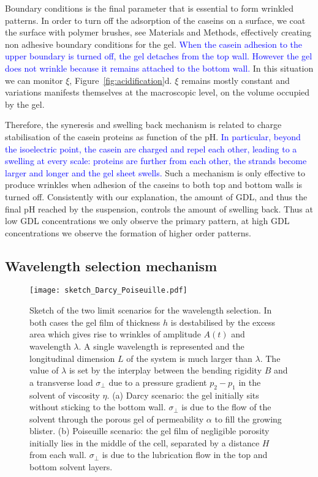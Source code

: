 \documentclass[twocolumn,superscriptaddress,showpacs,preprintnumbers, amsmath,amssymb,prl]{revtex4-1}
\begin{document}
Boundary conditions is the final parameter that is essential to form wrinkled patterns. In order to turn off the adsorption of the caseins on a surface, we coat the surface with polymer brushes, see Materials and Methods, effectively creating non adhesive boundary conditions for the gel. \textcolor{blue}{When the casein adhesion to the upper boundary is turned off, the gel detaches from the top wall. However the gel does not wrinkle because it remains attached to the bottom wall.} In this situation we can monitor $\xi$, Figure~\ref{fig:acidification}d. $\xi$ remains mostly constant and variations manifests themselves at the macroscopic level, on the volume occupied by the gel.


Therefore, the syneresis and swelling back mechanism is related to charge stabilisation of the casein proteins as function of the pH. \textcolor{blue}{In particular, beyond the isoelectric point, the casein are charged and repel each other, leading to a swelling at every scale: proteins are further from each other, the strands become larger and longer and the gel sheet swells.} Such a mechanism is only effective to produce wrinkles when adhesion of the caseins to both top and bottom walls is turned off. Consistently with our explanation, the amount of GDL, and thus the final pH reached by the suspension, controls the amount of swelling back. Thus at low GDL concentrations we only observe the primary pattern, at high GDL concentrations we observe the formation of higher order patterns.





\subsection*{Wavelength selection mechanism}

\begin{figure}
\texttt{[image: sketch\_Darcy\_Poiseuille.pdf]}
\caption{Sketch of the two limit scenarios for the wavelength selection. In both cases the gel film of thickness $h$ is destabilised by the excess area which gives rise to wrinkles of amplitude $A(t)$ and wavelength $\lambda$. A single wavelength is represented and the longitudinal dimension $L$ of the system is much larger than $\lambda$. The value of $\lambda$ is set by the interplay between the bending rigidity $B$ and a transverse load $\sigma_\perp$ due to a pressure gradient $p_2-p_1$ in the solvent of viscosity $\eta$. (a) Darcy scenario: the gel initially sits without sticking to the bottom wall. $\sigma_\perp$ is due to the flow of the solvent through the porous gel of permeability $\alpha$ to fill the growing blister. (b) Poiseuille scenario: the gel film of negligible porosity initially lies in the middle of the cell, separated by a distance $H$ from each wall. $\sigma_\perp$ is due to the lubrication flow in the top and bottom solvent layers.}
\label{fig:sketchDP}
\end{figure}
\end{document}
